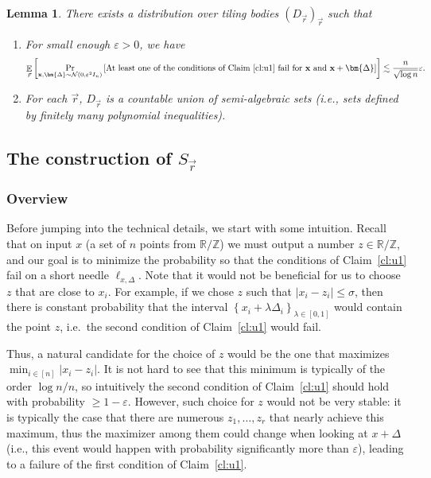 \documentclass[10pt,a4paper]{article}
\newtheorem{lemma}[thm]{Lemma}
\newcommand\card[1]{\left| {#1} \right|}
\newcommand\set[1]{{\left\{ #1 \right\}}}
\newcommand\Prob[2]{{\Pr_{#1}\left[ {#2} \right]}}
\newcommand\Expect[2]{{\mathop{\mathbb{E}}_{#1}\left[ {#2} \right]}}
\newcommand\eps{\varepsilon}
\renewcommand\geq{\geqslant}
\renewcommand\leq{\leqslant}
\newcommand{\ZZ}{\mathbb{Z}}
\newcommand{\RR}{\mathbb{R}}
\newcommand{\De}{\Delta}
\def\ll{\lesssim}
\begin{document}
\begin{lemma}\label{lem:main_ub_use}
  There exists a distribution over tiling bodies $(D_{\vec{r}})_{\vec{r}}$ such that

  \begin{enumerate}
    \item For small enough $\eps>0$, we have
    \[
    \Expect{\vec{r}}{\Prob{{\bf x}, \bm{\De}\sim\mathcal{N}(0,\eps^2 I_n)}{\text{At least one of the conditions of Claim~\ref{cl:u1} fail for ${\bf x}$ and ${\bf x}+\bm{\De}$}}}
    \ll \frac{n}{\sqrt{\log n}} \eps.
    \]

    \item For each $\vec{r}$, $D_{\vec{r}}$ is a countable union of semi-algebraic sets (i.e., sets defined by finitely many polynomial inequalities).
  \end{enumerate}
\end{lemma}


\subsection{The construction of $S_{\vec{r}}$}
\subsubsection{Overview}
Before jumping into the technical details, we start with some intuition. Recall that on input $x$ (a set of $n$ points from $\RR/\ZZ$)
we must output a number $z\in\RR/\ZZ$, and our goal is to minimize the probability so that the conditions of Claim~\ref{cl:u1} fail
on a short needle $\ell_{x,\De}$. Note that it would not be beneficial for us to choose $z$ that are close to $x_i$. For example,
if we chose $z$ such that $\card{x_i-z_i}\leq \sigma$, then there is constant probability that the interval $\set{x_i + \lambda \De_i}_{\lambda\in[0,1]}$
would contain the point $z$, i.e.\ the second condition of Claim~\ref{cl:u1} would fail.

Thus, a natural candidate for the choice of $z$ would be the one that maximizes $\min_{i\in[n]}{\card{x_i - z_i}}$. It is not hard to see that this minimum
is typically of the order $\log n/n$, so intuitively the second condition of Claim~\ref{cl:u1} should hold with probability $\geq 1-\eps$. However, such choice
for $z$ would not be very stable: it is typically the case that there are numerous $z_1,\ldots,z_r$ that nearly achieve this maximum, thus the maximizer among
them could change when looking at $x+\De$ (i.e., this event would happen with probability significantly more than $\eps$), leading to a failure of the first
condition of Claim~\ref{cl:u1}.
\end{document}
